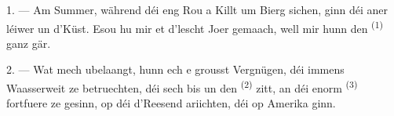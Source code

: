 %
%
%
%

\VUsaut{4.0mm}
\VUsaut{3.0mm}
\VUsaut{3.0mm}

1. --- Am Summer, während déi eng Rou a Killt um Bierg sichen, ginn déi aner léiwer
un d'Küst. Esou hu mir et d'lescht Joer gemaach, well mir hunn den 
\textsuperscript{(1)} ganz gär.

2. --- Wat mech ubelaangt, hunn ech e grousst Vergnügen, déi immens Waasserweit ze
betruechten, déi sech bis un den  \textsuperscript{(2)} zitt, an déi
enorm  \textsuperscript{(3)} fortfuere ze gesinn, op déi
d'Reesend ariichten, déi op Amerika ginn.

